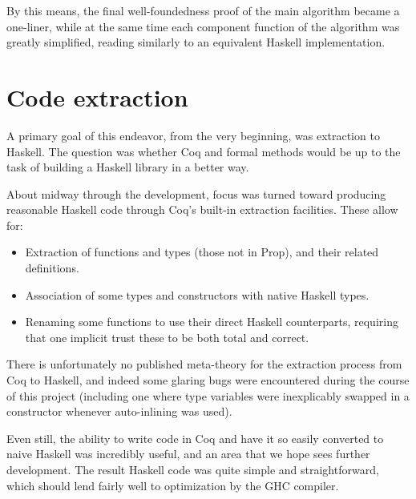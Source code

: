 \documentclass{llncs}
\begin{document}
By this means, the final well-foundedness proof of the main algorithm became a
one-liner, while at the same time each component function of the algorithm was
greatly simplified, reading similarly to an equivalent Haskell implementation.


\section{Code extraction}
\label{sec:extract}

A primary goal of this endeavor, from the very beginning, was extraction to
Haskell.  The question was whether Coq and formal methods would be up to the
task of building a Haskell library in a better way.

About midway through the development, focus was turned toward producing
reasonable Haskell code through Coq's built-in extraction facilities.  These
allow for:

\begin{itemize}
\item Extraction of functions and types (those not in Prop), and their related
  definitions.

\item Association of some types and constructors with native Haskell types.

\item Renaming some functions to use their direct Haskell counterparts,
  requiring that one implicit trust these to be both total and correct.
\end{itemize}

There is unfortunately no published meta-theory for the extraction process
from Coq to Haskell, and indeed some glaring bugs were encountered during the
course of this project (including one where type variables were inexplicably
swapped in a constructor whenever auto-inlining was used).

Even still, the ability to write code in Coq and have it so easily converted
to naive Haskell was incredibly useful, and an area that we hope sees further
development.  The result Haskell code was quite simple and straightforward,
which should lend fairly well to optimization by the GHC compiler.



\end{document}
